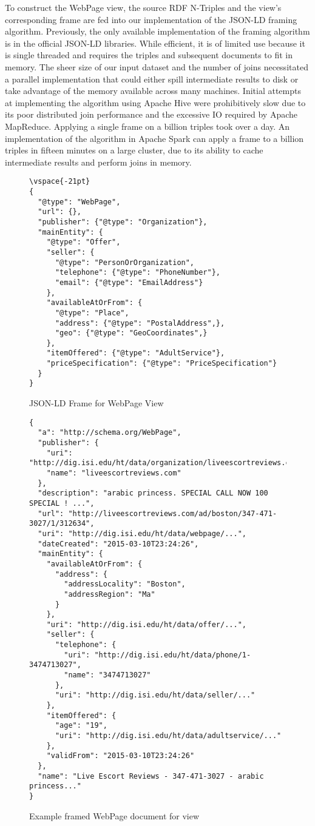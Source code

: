To construct the WebPage view, the source RDF N-Triples and the view's corresponding frame are fed into our implementation of the JSON-LD framing algorithm.  
Previously, the only available implementation of the framing algorithm is in the official JSON-LD libraries.  
While efficient, it is of limited use because it  is single threaded and requires the triples and subsequent documents to fit in memory.
The sheer size of our input dataset and the number of joins necessitated a parallel implementation that could either spill intermediate results to disk or take advantage of the memory available across many machines. 
Initial attempts at implementing the algorithm using Apache Hive were prohibitively slow due to its poor distributed join performance and the excessive IO required by Apache MapReduce.  Applying a single frame on a billion triples took over a day.  
An implementation of the algorithm in Apache Spark can apply a frame to a billion triples in fifteen minutes on a large cluster, due to its ability to cache intermediate results and perform joins in memory.   
\begin{figure}
\begin{verbatim}
\vspace{-21pt}
{
  "@type": "WebPage",
  "url": {},
  "publisher": {"@type": "Organization"},
  "mainEntity": {
    "@type": "Offer",
    "seller": {
      "@type": "PersonOrOrganization",
      "telephone": {"@type": "PhoneNumber"},
      "email": {"@type": "EmailAddress"}
    },
    "availableAtOrFrom": {
      "@type": "Place",
      "address": {"@type": "PostalAddress",},
      "geo": {"@type": "GeoCoordinates",}
    },
    "itemOffered": {"@type": "AdultService"},
    "priceSpecification": {"@type": "PriceSpecification"}
  }
}
\end{verbatim}
\caption{JSON-LD Frame for WebPage View}
\label{fig:json_ld_webpage_view}
\vspace{-21pt}
\end{figure}
\begin{figure}
\begin{verbatim}
{
  "a": "http://schema.org/WebPage",
  "publisher": {
    "uri": "http://dig.isi.edu/ht/data/organization/liveescortreviews.com",
    "name": "liveescortreviews.com"
  },
  "description": "arabic princess. SPECIAL CALL NOW 100 SPECIAL ! ...",
  "url": "http://liveescortreviews.com/ad/boston/347-471-3027/1/312634",
  "uri": "http://dig.isi.edu/ht/data/webpage/...",
  "dateCreated": "2015-03-10T23:24:26",
  "mainEntity": {
    "availableAtOrFrom": {
      "address": {
        "addressLocality": "Boston",
        "addressRegion": "Ma"
      }
    },
    "uri": "http://dig.isi.edu/ht/data/offer/...",
    "seller": {
      "telephone": {
        "uri": "http://dig.isi.edu/ht/data/phone/1-3474713027",
        "name": "3474713027"
      },
      "uri": "http://dig.isi.edu/ht/data/seller/..."
    },
    "itemOffered": {
      "age": "19",
      "uri": "http://dig.isi.edu/ht/data/adultservice/..."
    },
    "validFrom": "2015-03-10T23:24:26"
  },
  "name": "Live Escort Reviews - 347-471-3027 - arabic princess..."
}
\end{verbatim}
\vspace{-21pt}
\caption{Example framed WebPage document for view}
\label{fig:framed-webpage}
\end{figure}
